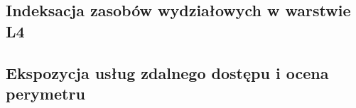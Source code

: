 \subsection{Indeksacja zasobów wydziałowych w warstwie L4}\label{subsec:wyniki-shodan-censys}

\subsection{Ekspozycja usług zdalnego dostępu i ocena perymetru}\label{subsec:banery-uslug}
